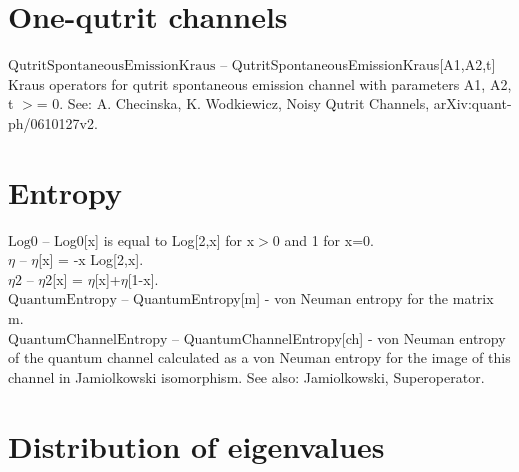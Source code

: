 \documentclass[a4paper,10pt]{scrartcl}
\begin{document}
\section{One-qutrit channels}

\noindent\textbf{$ \text{QutritSpontaneousEmissionKraus} $ }-- QutritSpontaneousEmissionKraus[A1,A2,t] Kraus operators for qutrit spontaneous emission channel with parameters A1, A2, t $>$= 0. See: A. Checinska, K. Wodkiewicz, Noisy Qutrit Channels, arXiv:quant-ph/0610127v2.$  $\\[8pt]
\section{Entropy}

\noindent\textbf{$ \text{Log0} $ }-- Log0[x] is equal to Log[2,x] for x$>$0 and 1 for x=0.$  $\\[8pt]
\noindent\textbf{$ \eta  $ }-- $\eta $[x] = -x Log[2,x].$  $\\[8pt]
\noindent\textbf{$ \text{$\eta $2} $ }-- $\eta $2[x] = $\eta $[x]+$\eta $[1-x].$  $\\[8pt]
\noindent\textbf{$ \text{QuantumEntropy} $ }-- QuantumEntropy[m] - von Neuman entropy for the matrix m.$  $\\[8pt]
\noindent\textbf{$ \text{QuantumChannelEntropy} $ }-- QuantumChannelEntropy[ch] - von Neuman entropy of the quantum channel calculated as a von Neuman entropy for the image of this channel in Jamiolkowski isomorphism. See also: Jamiolkowski, Superoperator.$  $\\[8pt]
\section{Distribution of eigenvalues}
\end{document}
